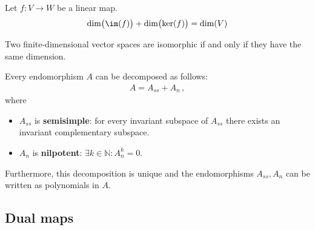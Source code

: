 
    \begin{theorem}\label{linalgebra:dimension_theorem}
        Let $f:V\rightarrow W$ be a linear map.
        \begin{gather}
            \dim\bigl(\im(f)\bigr) + \dim\bigl(\ker(f)\bigr) = \dim(V)
        \end{gather}
    \end{theorem}
    \begin{result}\label{linalgebra:dimension_isomorphism}
        Two finite-dimensional vector spaces are isomorphic if and only if they have the same dimension.
    \end{result}

    \begin{property}\label{linalgebra:jordan_chevalley}
        Every endomorphism $A$ can be decomposed as follows:
        \begin{gather}
            A = A_{ss} + A_n\,,
        \end{gather}
        where
        \begin{itemize}
            \item $A_{ss}$ is \textbf{semisimple}: for every invariant subspace of $A_{ss}$ there exists an invariant complementary subspace.
            \item $A_n$ is \textbf{nilpotent}: $\exists k\in\mathbb{N}:A_n^k = 0$.
        \end{itemize}
        Furthermore, this decomposition is unique and the endomorphisms $A_{ss},A_n$ can be written as polynomials in $A$.
    \end{property}

\subsection{Dual maps}

